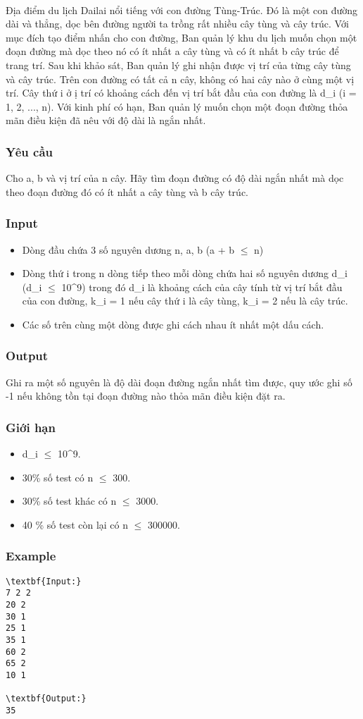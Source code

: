 

 

Địa điểm du lịch Dailai nổi tiếng với con đường Tùng-Trúc. Đó là một con đường dài và thẳng, dọc bên đường người ta trồng rất nhiều cây tùng và cây trúc. Với mục đích tạo điểm nhấn cho con đường, Ban quản lý khu du lịch muốn chọn một đoạn đường mà dọc theo nó có ít nhất a cây tùng và có ít nhất b cây trúc để trang trí. Sau khi khảo sát, Ban quản lý ghi nhận được vị trí của từng cây tùng và cây trúc. Trên con đường có tất cả n cây, không có hai cây nào ở cùng một vị trí. Cây thứ i ở ị trí có khoảng cách đến vị trí bắt đầu của con đường là d\_i (i = 1, 2, ..., n). Với kinh phí có hạn, Ban quản lý muốn chọn một đoạn đường thỏa mãn điều kiện đã nêu với độ dài là ngắn nhất.

\subsubsection{Yêu cầu}

Cho a, b và vị trí của n cây. Hãy tìm đoạn đường có độ dài ngắn nhất mà dọc theo đoạn đường đó có ít nhất a cây tùng và b cây trúc.

\subsubsection{Input}
\begin{itemize}
	\item Dòng đầu chứa 3 số nguyên dương n, a, b (a + b  $\le$  n)
	\item Dòng thứ i trong n dòng tiếp theo mỗi dòng chứa hai số nguyên dương d\_i (d\_i  $\le$  10^9) trong đó d\_i là khoảng cách của cây tính từ vị trí bắt đầu của con đường, k\_i = 1 nếu cây thứ i là cây tùng, k\_i = 2 nếu là cây trúc.
	\item Các số trên cùng một dòng được ghi cách nhau ít nhất một dấu cách.
\end{itemize}

\subsubsection{Output}

Ghi ra một số nguyên là độ dài đoạn đường ngắn nhất tìm được, quy ước ghi số -1 nếu không tồn tại đoạn đường nào thỏa mãn điều kiện đặt ra.

\subsubsection{Giới hạn}
\begin{itemize}
	\item d\_i  $\le$  10^9.
	\item 30\% số test có n  $\le$  300.
	\item 30\% số test khác có n  $\le$  3000.
	\item 40 \% số test còn lại có n  $\le$  300000.
\end{itemize}

\subsubsection{Example}
\begin{verbatim}
\textbf{Input:}
7 2 2
20 2
30 1
25 1
35 1
60 2
65 2
10 1

\textbf{Output:}
35\end{verbatim}
